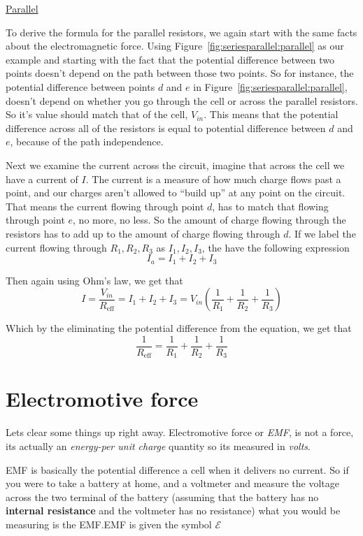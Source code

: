 \documentclass[12pt]{article}
\begin{document}
\underline{Parallel}

To derive the formula for the parallel resistors, we again start with the same facts about the electromagnetic force. Using Figure~\ref{fig:seriesparallel:parallel} as our example and starting with the fact that the potential difference between two points doesn't depend on the path between those two points. So for instance, the potential difference between points $d$ and $e$ in Figure~\ref{fig:seriesparallel:parallel}, doesn't depend on whether you go through the cell or across the parallel resistors. So it's value should match that of the cell, $V_{in}$. This means that the potential difference across all of the resistors is equal to potential difference between $d$ and $e$, because of the path independence.

Next we examine the current across the circuit, imagine that across the cell we have a current of $I$. The current is a measure of how much charge flows past a point, and our charges aren't allowed to ``build up'' at any point on the circuit. That means the current flowing through point $d$, has to match that flowing through point $e$, no more, no less. So the amount of charge flowing through the resistors has to add up to the amount of charge flowing through $d$. If we label the current flowing through $R_1,R_2,R_3$ as $I_1, I_2, I_3$, the have the following expression
$$I_a = I_1 + I_2 + I_3$$

Then again using Ohm's law, we get that
$$I = \frac{V_{in}}{R_{\text{eff}}} = I_1 + I_2 + I_3 = V_{in}(\frac{1}{R_1}+\frac{1}{R_2}+\frac{1}{R_3})$$

Which by the eliminating the potential difference from the equation, we get that
$$\frac{1}{R_{\text{eff}}} = \frac{1}{R_1}+ \frac{1}{R_2}+ \frac{1}{R_3}$$


\section{Electromotive force}\label{electromotive-force}



Lets clear some things up right away. Electromotive force or \emph{EMF},
is not a force, its actually an \emph{energy-per unit charge} quantity
so its measured in \emph{volts}.

EMF is basically the potential difference a cell when it delivers no
current. So if you were to take a battery at home, and a voltmeter and
measure the voltage across the two terminal of the battery (assuming
that the battery has no \textbf{internal resistance} and the voltmeter
has no resistance) what you would be measuring is the EMF.\@ EMF is given the symbol $\mathcal{E}$
\end{document}
